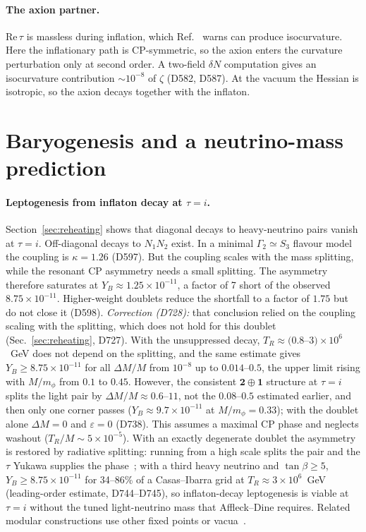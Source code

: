 \documentclass[aps,prd,twocolumn,superscriptaddress,nofootinbib,floatfix]{revtex4-2}
\begin{document}
\paragraph{The axion partner.} $\mathrm{Re}\,\tau$ is massless during inflation, which Ref.~\cite{arXiv_2503_14904} warns can produce isocurvature. Here the inflationary path is CP-symmetric, so the axion enters the curvature perturbation only at second order. A two-field $\delta N$ computation gives an isocurvature contribution $\sim 10^{-8}$ of $\zeta$ (D582, D587). At the vacuum the Hessian is isotropic, so the axion decays together with the inflaton.

\section{Baryogenesis and a neutrino-mass prediction}\label{sec:baryo}
\paragraph{Leptogenesis from inflaton decay at $\tau=i$.} Section~\ref{sec:reheating} shows that diagonal decays to heavy-neutrino pairs vanish at $\tau = i$. Off-diagonal decays to $N_1N_2$ exist. In a minimal $\Gamma_2 \simeq S_3$ flavour model the coupling is $\kappa = 1.26$ (D597). But the coupling scales with the mass splitting, while the resonant CP asymmetry needs a small splitting. The asymmetry therefore saturates at $Y_B \approx 1.25\times10^{-11}$, a factor of 7 short of the observed $8.75\times10^{-11}$. Higher-weight doublets reduce the shortfall to a factor of $1.75$ but do not close it (D598). \emph{Correction (D728):} that conclusion relied on the coupling scaling with the splitting, which does not hold for this doublet (Sec.~\ref{sec:reheating}, D727). With the unsuppressed decay, $T_R\approx(0.8$--$3)\times10^6$~GeV does not depend on the splitting, and the same estimate gives $Y_B\ge8.75\times10^{-11}$ for all $\Delta M/M$ from $10^{-8}$ up to $0.014$--$0.5$, the upper limit rising with $M/m_\phi$ from $0.1$ to $0.45$. However, the consistent $\mathbf2\oplus\mathbf1$ structure at $\tau=i$ splits the light pair by $\Delta M/M\approx0.6$--$11$, not the $0.08$--$0.5$ estimated earlier, and then only one corner passes ($Y_B\approx9.7\times10^{-11}$ at $M/m_\phi=0.33$); with the doublet alone $\Delta M=0$ and $\varepsilon=0$ (D738). This assumes a maximal CP phase and neglects washout ($T_R/M\sim5\times10^{-5}$). With an exactly degenerate doublet the asymmetry is restored by radiative splitting: running from a high scale splits the pair and the $\tau$ Yukawa supplies the phase~\cite{BrancoRadLepto2005}; with a third heavy neutrino and $\tan\beta\ge5$, $Y_B\ge8.75\times10^{-11}$ for 34--86\% of a Casas--Ibarra grid at $T_R\approx3\times10^6$~GeV (leading-order estimate, D744--D745), so inflaton-decay leptogenesis is viable at $\tau=i$ without the tuned light-neutrino mass that Affleck--Dine requires. Related modular constructions use other fixed points or vacua~\cite{arXiv_2411_18603,arXiv_2604_04585}.
\end{document}
